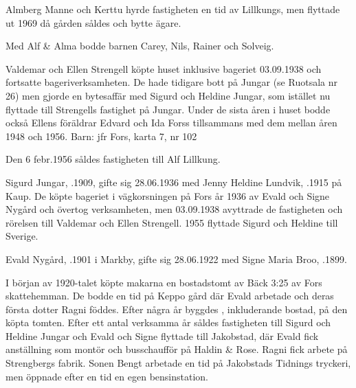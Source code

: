Almberg Manne och Kerttu hyrde fastigheten en tid av Lillkungs, men flyttade ut 1969 då gården såldes och bytte ägare.

Med Alf \& Alma bodde barnen Carey, Nils, Rainer och Solveig.


Valdemar och Ellen Strengell köpte huset inklusive bageriet 03.09.1938 och fortsatte bageriverksamheten. De hade tidigare bott på Jungar (se Ruotsala nr 26) men gjorde en bytesaffär med Sigurd och Heldine Jungar, som istället nu flyttade till Strengells fastighet på Jungar. Under de sista åren i huset bodde också Ellens föräldrar Edvard och Ida Forss tillsammans med dem mellan åren 1948 och 1956.
Barn: jfr Fors, karta 7, nr 102

Den 6 febr.1956 såldes fastigheten till Alf Lillkung.


Sigurd Jungar, .1909, gifte sig 28.06.1936 med Jenny Heldine Lundvik, .1915 på Kaup. De köpte bageriet i vägkorsningen på Fors år 1936 av Evald och Signe Nygård och övertog verksamheten, men 03.09.1938 avyttrade de fastigheten och rörelsen till Valdemar och Ellen Strengell. 1955 flyttade Sigurd och Heldine till Sverige.
\begin{jhchildren}
  \item {}
  \item {}
  \item {}
\end{jhchildren}


Evald Nygård, .1901 i Markby, gifte sig 28.06.1922 med Signe Maria Broo, .1899.

I början av 1920-talet köpte makarna en bostadstomt av Bäck 3:25 av Fors skattehemman. De bodde en tid på Keppo gård där Evald arbetade och deras första dotter Ragni föddes. Efter några år byggdes , inkluderande bostad, på den köpta tomten. Efter ett antal verksamma år såldes fastigheten till Sigurd och Heldine Jungar och Evald och Signe flyttade till Jakobstad, där Evald fick anställning som montör och busschaufför på Haldin \& Rose. Ragni fick arbete på Strengbergs fabrik. Sonen Bengt arbetade en tid på Jakobstads Tidnings tryckeri, men öppnade efter en tid en egen bensinstation.
\begin{jhchildren}
  \item {}
  \item {}
\end{jhchildren}



